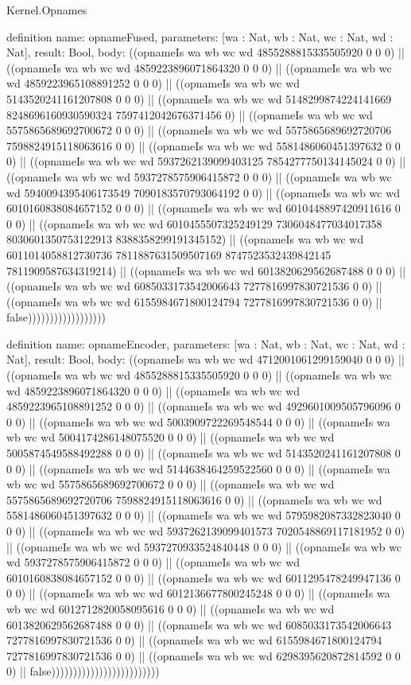 \begin{lexlean}{Kernel.Opnames}
\begin{semanticmodule}
definition{
  name: opnameFused,
  parameters: [wa : Nat, wb : Nat, wc : Nat, wd : Nat],
  result: Bool,
  body: ((opnameIs wa wb wc wd 4855288815335505920 0 0 0) || ((opnameIs wa wb wc wd 4859223896071864320 0 0 0) || ((opnameIs wa wb wc wd 4859223965108891252 0 0 0) || ((opnameIs wa wb wc wd 5143520241161207808 0 0 0) || ((opnameIs wa wb wc wd 5148299874224141669 8248696160930590324 7597412042676371456 0) || ((opnameIs wa wb wc wd 5575865689692700672 0 0 0) || ((opnameIs wa wb wc wd 5575865689692720706 7598824915118063616 0 0) || ((opnameIs wa wb wc wd 5581486060451397632 0 0 0) || ((opnameIs wa wb wc wd 5937262139099403125 7854277750134145024 0 0) || ((opnameIs wa wb wc wd 5937278575906415872 0 0 0) || ((opnameIs wa wb wc wd 5940094395406173549 7090183570793064192 0 0) || ((opnameIs wa wb wc wd 6010160838084657152 0 0 0) || ((opnameIs wa wb wc wd 6010448897420911616 0 0 0) || ((opnameIs wa wb wc wd 6010455507325249129 7306048477034017358 8030601350753122913 8388358299191345152) || ((opnameIs wa wb wc wd 6011014058812730736 7811887631509507169 8747523532439842145 7811909587634319214) || ((opnameIs wa wb wc wd 6013820629562687488 0 0 0) || ((opnameIs wa wb wc wd 6085033173542006643 7277816997830721536 0 0) || ((opnameIs wa wb wc wd 6155984671800124794 7277816997830721536 0 0) || false))))))))))))))))))
}

definition{
  name: opnameEncoder,
  parameters: [wa : Nat, wb : Nat, wc : Nat, wd : Nat],
  result: Bool,
  body: ((opnameIs wa wb wc wd 4712001061299159040 0 0 0) || ((opnameIs wa wb wc wd 4855288815335505920 0 0 0) || ((opnameIs wa wb wc wd 4859223896071864320 0 0 0) || ((opnameIs wa wb wc wd 4859223965108891252 0 0 0) || ((opnameIs wa wb wc wd 4929601009505796096 0 0 0) || ((opnameIs wa wb wc wd 5003909722269548544 0 0 0) || ((opnameIs wa wb wc wd 5004174286148075520 0 0 0) || ((opnameIs wa wb wc wd 5005874549588492288 0 0 0) || ((opnameIs wa wb wc wd 5143520241161207808 0 0 0) || ((opnameIs wa wb wc wd 5144638464259522560 0 0 0) || ((opnameIs wa wb wc wd 5575865689692700672 0 0 0) || ((opnameIs wa wb wc wd 5575865689692720706 7598824915118063616 0 0) || ((opnameIs wa wb wc wd 5581486060451397632 0 0 0) || ((opnameIs wa wb wc wd 5795982087332823040 0 0 0) || ((opnameIs wa wb wc wd 5937262139099401573 7020548869117181952 0 0) || ((opnameIs wa wb wc wd 5937270933524840448 0 0 0) || ((opnameIs wa wb wc wd 5937278575906415872 0 0 0) || ((opnameIs wa wb wc wd 6010160838084657152 0 0 0) || ((opnameIs wa wb wc wd 6011295478249947136 0 0 0) || ((opnameIs wa wb wc wd 6012136677800245248 0 0 0) || ((opnameIs wa wb wc wd 6012712820058095616 0 0 0) || ((opnameIs wa wb wc wd 6013820629562687488 0 0 0) || ((opnameIs wa wb wc wd 6085033173542006643 7277816997830721536 0 0) || ((opnameIs wa wb wc wd 6155984671800124794 7277816997830721536 0 0) || ((opnameIs wa wb wc wd 6298395620872814592 0 0 0) || false)))))))))))))))))))))))))
}


\end{semanticmodule}
\end{lexlean}
